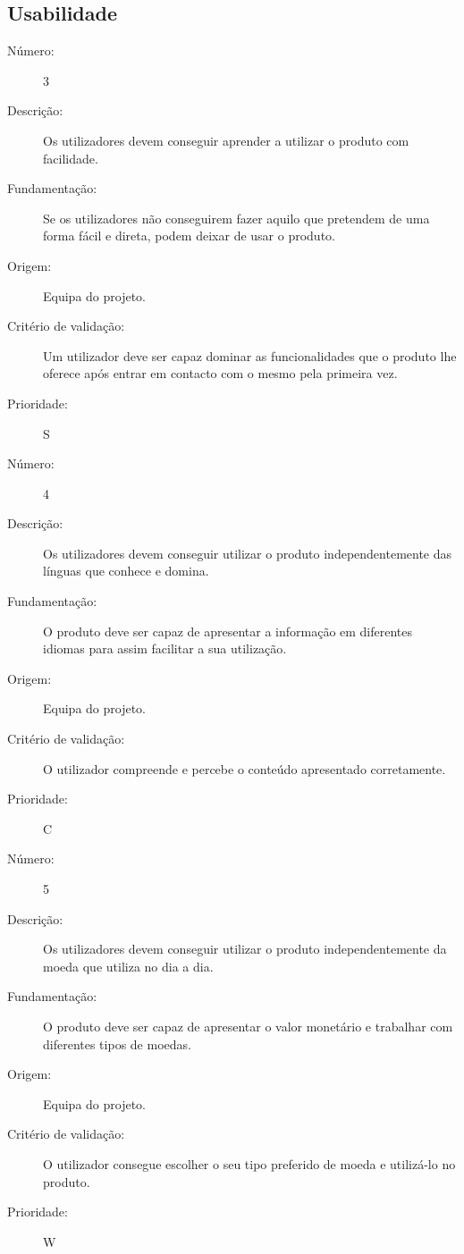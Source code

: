 \documentclass[12pt,a4paper]{article}
\begin{document}
  \subsection{Usabilidade}
     \begin{description}
        \item[Número:]3
        \item[Descrição:] Os utilizadores devem conseguir aprender a utilizar o produto com facilidade.
        \item[Fundamentação:]Se os utilizadores não conseguirem fazer aquilo que pretendem de uma forma fácil e direta, podem deixar de usar o produto.
        \item[Origem:]Equipa do projeto.
        \item[Critério de validação:]Um utilizador deve ser capaz dominar as funcionalidades que o produto lhe oferece após entrar em contacto com o mesmo pela primeira vez.
        \item[Prioridade:]S
      \end{description}
      \vspace{0.5cm}
      \begin{description}
        \item[Número:]4
        \item[Descrição:]Os utilizadores devem conseguir utilizar o produto independentemente das línguas que conhece e domina.
        \item[Fundamentação:]O produto deve ser capaz de apresentar a informação em diferentes idiomas para assim facilitar a sua utilização.
        \item[Origem:]Equipa do projeto.
        \item[Critério de validação:]O utilizador compreende e percebe o conteúdo apresentado corretamente.    
        \item[Prioridade:]C
      \end{description}
      \vspace{0.5cm}
      \begin{description}
        \item[Número:]5
        \item[Descrição:]Os utilizadores devem conseguir utilizar o produto independentemente da moeda que utiliza no dia a dia.
        \item[Fundamentação:]O produto deve ser capaz de apresentar o valor monetário e trabalhar com diferentes tipos de moedas.
        \item[Origem:]Equipa do projeto.
        \item[Critério de validação:]O utilizador consegue escolher o seu tipo preferido de moeda e utilizá-lo no produto.
        \item[Prioridade:]W
      \end{description}
\end{document}
